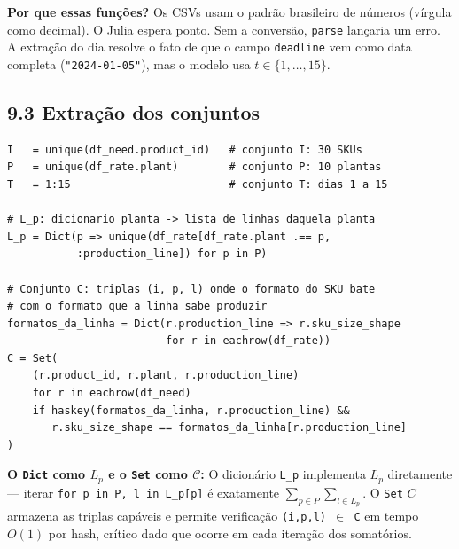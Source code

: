 \documentclass[12pt, a4paper]{article}
\begin{document}
\begin{mdframed}[style=destaque]
\textbf{\color{ballblue}Por que essas fun\c{c}\~{o}es?}
Os CSVs usam o padr\~{a}o brasileiro de n\'{u}meros (v\'{i}rgula como decimal).
O Julia espera ponto. Sem a convers\~{a}o, \texttt{parse} lan\c{c}aria um erro.
A extra\c{c}\~{a}o do dia resolve o fato de que o campo \texttt{deadline} vem
como data completa (\texttt{"2024-01-05"}), mas o modelo usa $t \in \{1,\ldots,15\}$.
\end{mdframed}

\subsection*{9.3 Extra\c{c}\~{a}o dos conjuntos}

\begin{mdframed}[style=codigo]
\begin{lstlisting}
I   = unique(df_need.product_id)   # conjunto I: 30 SKUs
P   = unique(df_rate.plant)        # conjunto P: 10 plantas
T   = 1:15                         # conjunto T: dias 1 a 15

# L_p: dicionario planta -> lista de linhas daquela planta
L_p = Dict(p => unique(df_rate[df_rate.plant .== p,
           :production_line]) for p in P)

# Conjunto C: triplas (i, p, l) onde o formato do SKU bate
# com o formato que a linha sabe produzir
formatos_da_linha = Dict(r.production_line => r.sku_size_shape
                         for r in eachrow(df_rate))
C = Set(
    (r.product_id, r.plant, r.production_line)
    for r in eachrow(df_need)
    if haskey(formatos_da_linha, r.production_line) &&
       r.sku_size_shape == formatos_da_linha[r.production_line]
)
\end{lstlisting}
\end{mdframed}

\begin{mdframed}[style=destaque]
\textbf{\color{ballblue}O \texttt{Dict} como $L_p$ e o \texttt{Set} como $\mathcal{C}$:}
O dicion\'{a}rio \texttt{L\_p} implementa $L_p$ diretamente --- iterar
\texttt{for p in P, l in L\_p[p]} \'{e} exatamente $\sum_{p \in P}\sum_{l \in L_p}$.
O \texttt{Set} $C$ armazena as triplas cap\'{a}veis e permite verifica\c{c}\~{a}o
\texttt{(i,p,l) \ensuremath{\in} C} em tempo $O(1)$ por hash, cr\'{i}tico dado que ocorre
em cada itera\c{c}\~{a}o dos somatórios.
\end{mdframed}
\end{document}
